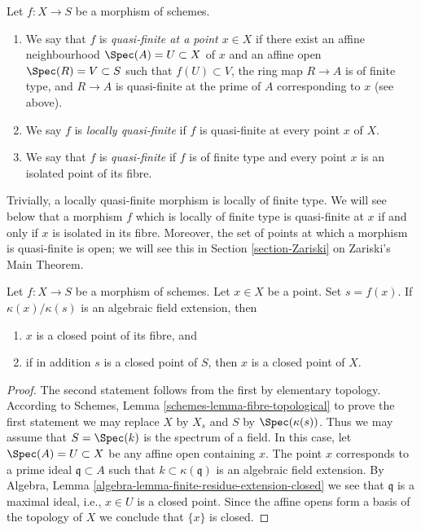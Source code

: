 \begin{definition}
\label{definition-quasi-finite}
Let $f : X \to S$ be a morphism of schemes.
\begin{enumerate}
\item We say that $f$ is {\it quasi-finite at a point $x \in X$}
if there exist an affine neighbourhood $\Spec(A) = U \subset X$
of $x$ and an affine open $\Spec(R) = V \subset S$ such that
$f(U) \subset V$, the ring map $R \to A$ is of finite type,
and $R \to A$ is quasi-finite at the prime of $A$ corresponding to $x$
(see above).
\item We say $f$ is {\it locally quasi-finite} if $f$ is
quasi-finite at every point $x$ of $X$.
\item We say that $f$ is {\it quasi-finite} if $f$ is of finite type
and every point $x$ is an isolated point of its fibre.
\end{enumerate}
\end{definition}

\noindent
Trivially, a locally quasi-finite morphism is locally of finite type.
We will see below that a morphism $f$ which is locally of finite type
is quasi-finite at $x$ if and only if $x$ is isolated in its fibre.
Moreover, the set of points at which a morphism is quasi-finite is open;
we will see this in Section \ref{section-Zariski} on Zariski's Main Theorem.

\begin{lemma}
\label{lemma-algebraic-residue-field-extension-closed-point-fibre}
Let $f : X \to S$ be a morphism of schemes.
Let $x \in X$ be a point. Set $s = f(x)$.
If $\kappa(x)/\kappa(s)$
is an algebraic field extension, then
\begin{enumerate}
\item $x$ is a closed point of its fibre, and
\item if in addition $s$ is a closed point of $S$, then
$x$ is a closed point of $X$.
\end{enumerate}
\end{lemma}

\begin{proof}
The second statement follows from the first by elementary topology.
According to Schemes, Lemma \ref{schemes-lemma-fibre-topological}
to prove the first statement
we may replace $X$ by $X_s$ and $S$ by $\Spec(\kappa(s))$.
Thus we may assume that $S = \Spec(k)$ is the spectrum of a field.
In this case, let $\Spec(A) = U \subset X$ be any affine open
containing $x$. The point $x$ corresponds to a prime ideal
$\mathfrak q \subset A$ such that $k \subset \kappa(\mathfrak q)$
is an algebraic field extension. By
Algebra, Lemma \ref{algebra-lemma-finite-residue-extension-closed}
we see that $\mathfrak q$ is a maximal ideal, i.e., $x \in U$ is a
closed point. Since the affine opens form
a basis of the topology of $X$ we conclude that $\{x\}$ is closed.
\end{proof}

